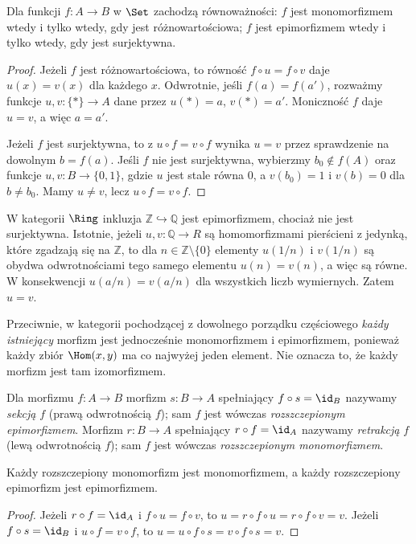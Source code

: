 \begin{twierdzenie}\label{tw:set-mono-epi}
Dla funkcji $f:A\to B$ w $\Set$ zachodzą równoważności: $f$ jest monomorfizmem wtedy i tylko wtedy, gdy jest różnowartościowa; $f$ jest epimorfizmem wtedy i tylko wtedy, gdy jest surjektywna.
\end{twierdzenie}
\begin{proof}
Jeżeli $f$ jest różnowartościowa, to równość $f\circ u=f\circ v$ daje $u(x)=v(x)$ dla każdego $x$. Odwrotnie, jeśli $f(a)=f(a')$, rozważmy funkcje $u,v:\{*\}\to A$ dane przez $u(*)=a$, $v(*)=a'$. Moniczność $f$ daje $u=v$, a więc $a=a'$.

Jeżeli $f$ jest surjektywna, to z $u\circ f=v\circ f$ wynika $u=v$ przez sprawdzenie na dowolnym $b=f(a)$. Jeśli $f$ nie jest surjektywna, wybierzmy $b_0\notin f(A)$ oraz funkcje $u,v:B\to\{0,1\}$, gdzie $u$ jest stale równa $0$, a $v(b_0)=1$ i $v(b)=0$ dla $b\neq b_0$. Mamy $u\neq v$, lecz $u\circ f=v\circ f$.
\end{proof}

\begin{przyklad}\label{przyklad:epi-pierscienie}
W kategorii $\Ring$ inkluzja $\mathbb Z\hookrightarrow\mathbb Q$ jest epimorfizmem, chociaż nie jest surjektywna. Istotnie, jeżeli $u,v:\mathbb Q\to R$ są homomorfizmami pierścieni z jedynką, które zgadzają się na $\mathbb Z$, to dla $n\in\mathbb Z\setminus\{0\}$ elementy $u(1/n)$ i $v(1/n)$ są obydwa odwrotnościami tego samego elementu $u(n)=v(n)$, a więc są równe. W konsekwencji $u(a/n)=v(a/n)$ dla wszystkich liczb wymiernych. Zatem $u=v$.

Przeciwnie, w kategorii pochodzącej z dowolnego porządku częściowego \emph{każdy istniejący} morfizm jest jednocześnie monomorfizmem i epimorfizmem, ponieważ każdy zbiór $\Hom(x,y)$ ma co najwyżej jeden element. Nie oznacza to, że każdy morfizm jest tam izomorfizmem.
\end{przyklad}

\begin{definicja}
Dla morfizmu $f:A\to B$ morfizm $s:B\to A$ spełniający $f\circ s=\id_B$ nazywamy \emph{sekcją} $f$ (prawą odwrotnością $f$); sam $f$ jest wówczas \emph{rozszczepionym epimorfizmem}. Morfizm $r:B\to A$ spełniający $r\circ f=\id_A$ nazywamy \emph{retrakcją} $f$ (lewą odwrotnością $f$); sam $f$ jest wówczas \emph{rozszczepionym monomorfizmem}.
\end{definicja}

\begin{stwierdzenie}
Każdy rozszczepiony monomorfizm jest monomorfizmem, a każdy rozszczepiony epimorfizm jest epimorfizmem.
\end{stwierdzenie}
\begin{proof}
Jeżeli $r\circ f=\id_A$ i $f\circ u=f\circ v$, to $u=r\circ f\circ u=r\circ f\circ v=v$. Jeżeli $f\circ s=\id_B$ i $u\circ f=v\circ f$, to $u=u\circ f\circ s=v\circ f\circ s=v$.
\end{proof}

